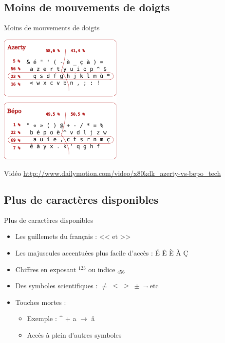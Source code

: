 \documentclass{beamer}
\begin{document}
\subsection{Moins de mouvements de doigts}
\begin{frame}{Moins de mouvements de doigts}
\begin{center}
  \includegraphics[height=6.5cm]{stats.png}
\end{center}
\end{frame}

\begin{frame}{Vidéo}
\url{http://www.dailymotion.com/video/x80kdk_azerty-vs-bepo_tech}
\end{frame}

\subsection{Plus de caractères disponibles}
\begin{frame}{Plus de caractères disponibles}
\begin{itemize}
  \item Les guillemets du français : << et >>
  \pause
  \item Les majuscules accentuées plus facile d'accès : É Ê È À Ç
  \pause
  \item Chiffres en exposant $ ^{123} $ ou indice $ _{456} $
  \pause
  \item Des symboles scientifiques : $ \neq \;  \leq \; \geq \; \pm \; \neg $ etc
  \pause
  \item Touches mortes :
  \begin{itemize}
    \item Exemple : \textasciicircum \hspace{1mm} + a $ \rightarrow $ â
    \item Accès à plein d'autres symboles
  \end{itemize}
\end{itemize}
\end{frame}
\end{document}
